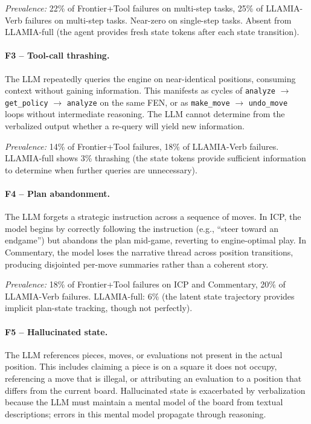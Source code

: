 \emph{Prevalence:} 22\% of Frontier+Tool failures on multi-step tasks, 25\% of LLAMIA-Verb failures on multi-step tasks. Near-zero on single-step tasks. Absent from LLAMIA-full (the agent provides fresh state tokens after each state transition).

\paragraph{F3 -- Tool-call thrashing.}
The LLM repeatedly queries the engine on near-identical positions, consuming context without gaining information. This manifests as cycles of \texttt{analyze} $\to$ \texttt{get\_policy} $\to$ \texttt{analyze} on the same FEN, or as \texttt{make\_move} $\to$ \texttt{undo\_move} loops without intermediate reasoning. The LLM cannot determine from the verbalized output whether a re-query will yield new information.

\emph{Prevalence:} 14\% of Frontier+Tool failures, 18\% of LLAMIA-Verb failures. LLAMIA-full shows 3\% thrashing (the state tokens provide sufficient information to determine when further queries are unnecessary).

\paragraph{F4 -- Plan abandonment.}
The LLM forgets a strategic instruction across a sequence of moves. In ICP, the model begins by correctly following the instruction (e.g., ``steer toward an endgame'') but abandons the plan mid-game, reverting to engine-optimal play. In Commentary, the model loses the narrative thread across position transitions, producing disjointed per-move summaries rather than a coherent story.

\emph{Prevalence:} 18\% of Frontier+Tool failures on ICP and Commentary, 20\% of LLAMIA-Verb failures. LLAMIA-full: 6\% (the latent state trajectory provides implicit plan-state tracking, though not perfectly).

\paragraph{F5 -- Hallucinated state.}
The LLM references pieces, moves, or evaluations not present in the actual position. This includes claiming a piece is on a square it does not occupy, referencing a move that is illegal, or attributing an evaluation to a position that differs from the current board. Hallucinated state is exacerbated by verbalization because the LLM must maintain a mental model of the board from textual descriptions; errors in this mental model propagate through reasoning.

